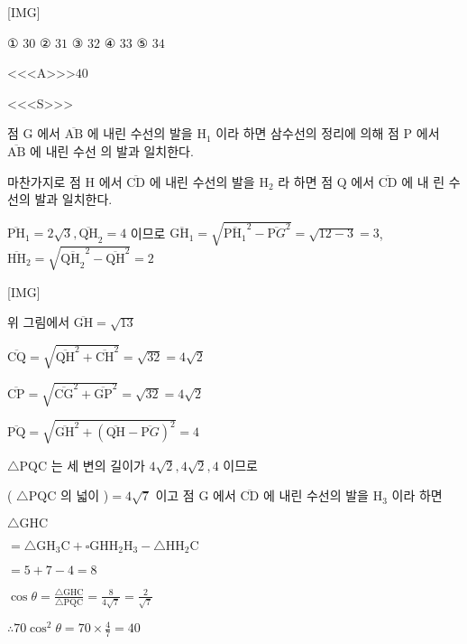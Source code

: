 \documentclass{oblivoir}
\begin{document}
[IMG]

① $30$
② $31$
③ $32$
④ $33$
⑤ $34$



<<<A>>>$40$

<<<S>>>



점 $\mathrm{G}$ 에서 $\overline{\mathrm{AB}}$ 에 내린 수선의 발을 $\mathrm{H}_{1}$ 이라 하면 삼수선의 정리에 의해 점 $\mathrm{P}$ 에서 $\overline{\mathrm{AB}}$ 에 내린 수선 의 발과 일치한다.

마찬가지로 점 $\mathrm{H}$ 에서 $\overline{\mathrm{CD}}$ 에 내린 수선의 발을 $\mathrm{H}_{2}$ 라 하면 점 $\mathrm{Q}$ 에서 $\overline{\mathrm{CD}}$ 에 내 린 수선의 발과 일치한다.

$\overline{\mathrm{PH}}_{1}=2 \sqrt{3}, \overline{\mathrm{QH}}_{2}=4$ 이므로
$\overline{\mathrm{GH}_{1}}=\sqrt{\overline{\mathrm{PH}_{1}}^{2}-\overline{\mathrm{P} G}^{2}}=\sqrt{12-3}=3$,
$\overline{\mathrm{HH}}_{2}=\sqrt{\overline{\mathrm{QH}_{2}}^{2}-\overline{\mathrm{QH}}^{2}}=2$

[IMG]

위 그림에서 $\overline{\mathrm{GH}}=\sqrt{13}$

$\overline{\mathrm{CQ}}=\sqrt{\overline{\mathrm{QH}}^{2}+\overline{\mathrm{CH}}^{2}}=\sqrt{32}=4 \sqrt{2}$

$\overline{\mathrm{CP}}=\sqrt{\overline{\mathrm{CG}}^{2}+\overline{\mathrm{GP}}^{2}}=\sqrt{32}=4 \sqrt{2}$

$\overline{\mathrm{PQ}}=\sqrt{\overline{\mathrm{GH}}^{2}+(\overline{\mathrm{QH}}-\overline{\mathrm{P} G})^{2}}=4$

$\triangle \mathrm{P} \mathrm{QC}$ 는 세 변의 길이가 $4 \sqrt{2}, 4 \sqrt{2}, 4$ 이므로

( $\triangle \mathrm{PQC}$ 의 넓이 )$=4 \sqrt{7}$ 이고 점 $\mathrm{G}$ 에서 $\overline{\mathrm{CD}}$ 에 내린 수선의 발을 $\mathrm{H}_{3}$ 이라 하면

$\triangle \mathrm{GHC}$

$=\triangle \mathrm{GH}_{3} \mathrm{C}+\square \mathrm{GHH}_{2} \mathrm{H}_{3}-\triangle \mathrm{HH}_{2} \mathrm{C}$

$=5+7-4=8$

$\cos \theta=\frac{\triangle \mathrm{GHC}}{\triangle \mathrm{P} \mathrm{QC}}=\frac{8}{4 \sqrt{7}}=\frac{2}{\sqrt{7}}$

$\therefore 70 \cos ^{2} \theta=70 \times \frac{4}{7}=40$
\end{document}
